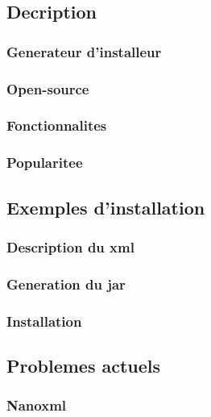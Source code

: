\subsection{Decription}
\subsubsection{Generateur d'installeur}
\subsubsection{Open-source}
\subsubsection{Fonctionnalites}
\subsubsection{Popularitee}
\subsection{Exemples d'installation}
\subsubsection{Description du xml}
\subsubsection{Generation du jar}
\subsubsection{Installation}
\subsection{Problemes actuels}
\subsubsection{Nanoxml}